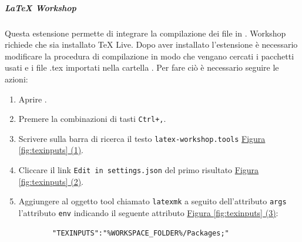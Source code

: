 \subparagraph{LaTeX Workshop}
Questa estensione permette di integrare la compilazione dei file  in .
 Workshop richiede che sia installato TeX Live.
Dopo aver installato l'estensione è necessario modificare la procedura di compilazione in modo che vengano cercati i pacchetti usati e i file .tex importati nella cartella .
Per fare ciò è necessario seguire le azioni:
\begin{enumerate}
    \item Aprire .
    
    \item Premere la combinazioni di tasti \texttt{Ctrl+,}.
    
    \item Scrivere sulla barra di ricerca il testo \texttt{latex-workshop.tools} \hyperref[fig:texinputs]{Figura \ref{fig:texinputs} (1)}.
    
    \item Cliccare il link \texttt{Edit in settings.json} del primo risultato \hyperref[fig:texinputs]{Figura \ref{fig:texinputs} (2)}.
    
    \item Aggiungere al oggetto tool chiamato \texttt{latexmk} a seguito dell'attributo \texttt{args} l'attributo \texttt{env} indicando il seguente attributo \hyperref[fig:texinputs]{Figura \ref{fig:texinputs} (3)}: 
    \begin{lstlisting}
        "TEXINPUTS":"%WORKSPACE_FOLDER%/Packages;"
    \end{lstlisting}
\end{enumerate}

